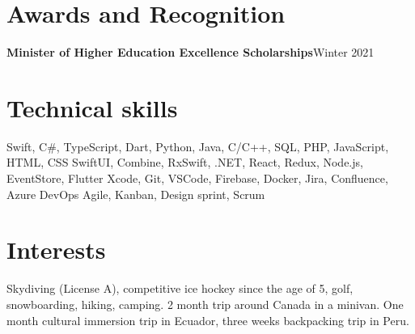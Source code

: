\documentclass[letterpaper,11pt]{article}
\begin{document}
\resumeSubHeadingListEnd

\vspace{1pt}
\section{Awards and Recognition}
\resumeSubHeadingListStart

\resumeProjectHeading
{\textbf{{Minister of Higher Education Excellence Scholarships}}}{Winter 2021}
\resumeItemListStart
{}
\resumeItemListEnd

\resumeSubHeadingListEnd

\vspace{1pt}
\section{Technical skills}
\resumeSubHeadingListStart

{Swift, C\#, TypeScript, Dart, Python, Java, C/C++, SQL, PHP, JavaScript, HTML, CSS}
{SwiftUI, Combine, RxSwift, .NET, React, Redux, Node.js, EventStore, Flutter}
{Xcode, Git, VSCode, Firebase, Docker, Jira, Confluence, Azure DevOps} 
{Agile, Kanban, Design sprint, Scrum}
\resumeSubHeadingListEnd


\vspace{1pt}
\section{Interests}
\resumeSubHeadingListStart
{}
{Skydiving (License A), competitive ice hockey since the age of 5, golf, snowboarding, hiking, camping.}
{2 month trip around Canada in a minivan. One month cultural immersion trip in Ecuador, three weeks backpacking trip in Peru.}
\resumeSubHeadingListEnd
\end{document}
